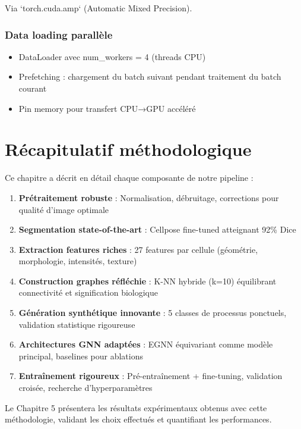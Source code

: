 Via `torch.cuda.amp` (Automatic Mixed Precision).

\subsubsection{Data loading parallèle}

\begin{itemize}
    \item DataLoader avec num\_workers = 4 (threads CPU)
    \item Prefetching : chargement du batch suivant pendant traitement du batch courant
    \item Pin memory pour transfert CPU→GPU accéléré
\end{itemize}

\section{Récapitulatif méthodologique}

Ce chapitre a décrit en détail chaque composante de notre pipeline :

\begin{enumerate}
    \item \textbf{Prétraitement robuste} : Normalisation, débruitage, corrections pour qualité d'image optimale
    \item \textbf{Segmentation state-of-the-art} : Cellpose fine-tuned atteignant 92\% Dice
    \item \textbf{Extraction features riches} : 27 features par cellule (géométrie, morphologie, intensités, texture)
    \item \textbf{Construction graphes réfléchie} : K-NN hybride (k=10) équilibrant connectivité et signification biologique
    \item \textbf{Génération synthétique innovante} : 5 classes de processus ponctuels, validation statistique rigoureuse
    \item \textbf{Architectures GNN adaptées} : EGNN équivariant comme modèle principal, baselines pour ablations
    \item \textbf{Entraînement rigoureux} : Pré-entraînement + fine-tuning, validation croisée, recherche d'hyperparamètres
\end{enumerate}

Le Chapitre 5 présentera les résultats expérimentaux obtenus avec cette méthodologie, validant les choix effectués et quantifiant les performances.
